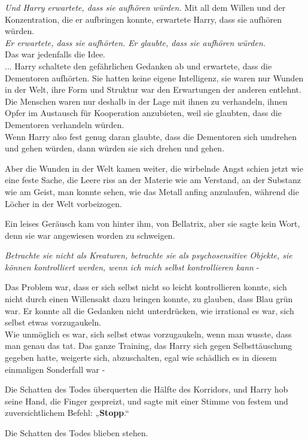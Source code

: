 {\emph{Und Harry erwartete, dass sie aufhören würden.} Mit all dem Willen und der Konzentration, die er aufbringen konnte, erwartete Harry, dass sie aufhören würden.\\ \emph{Er erwartete, dass sie aufhörten. Er glaubte, dass sie aufhören würden.}\\ Das war jedenfalls die Idee.\\ ... Harry schaltete den gefährlichen Gedanken ab und erwartete, dass die Dementoren aufhörten. Sie hatten keine eigene Intelligenz, sie waren nur Wunden in der Welt, ihre Form und Struktur war den Erwartungen der anderen entlehnt. Die Menschen waren nur deshalb in der Lage mit ihnen zu verhandeln, ihnen Opfer im Austausch für Kooperation anzubieten, weil sie glaubten, dass die Dementoren verhandeln würden.\\ Wenn Harry also fest genug daran glaubte, dass die Dementoren sich umdrehen und gehen würden, dann würden sie sich drehen und gehen.

Aber die Wunden in der Welt kamen weiter, die wirbelnde Angst schien jetzt wie eine feste Sache, die Leere riss an der Materie wie am Verstand, an der Substanz wie am Geist, man konnte sehen, wie das Metall anfing anzulaufen, während die Löcher in der Welt vorbeizogen.

Ein leises Geräusch kam von hinter ihm, von Bellatrix, aber sie sagte kein Wort, denn sie war angewiesen worden zu schweigen.

\emph{Betrachte sie nicht als Kreaturen, betrachte sie als psychosensitive Objekte, sie können kontrolliert werden, wenn ich mich selbst kontrollieren kann} -

Das Problem war, dass er sich selbst nicht so leicht kontrollieren konnte, sich nicht durch einen Willensakt dazu bringen konnte, zu glauben, dass Blau grün war. Er konnte all die Gedanken nicht unterdrücken, wie irrational es war, sich selbst etwas vorzugaukeln.\\ Wie unmöglich es war, sich selbst etwas vorzugaukeln, wenn man wusste, dass man genau das tat. Das ganze Training, das Harry sich gegen Selbsttäuschung gegeben hatte, weigerte sich, abzuschalten, egal wie schädlich es in diesem einmaligen Sonderfall war -

Die Schatten des Todes überquerten die Hälfte des Korridors, und Harry hob seine Hand, die Finger gespreizt, und sagte mit einer Stimme von festem und zuversichtlichem Befehl: „\textbf{Stopp}.“

Die Schatten des Todes blieben stehen.

}
